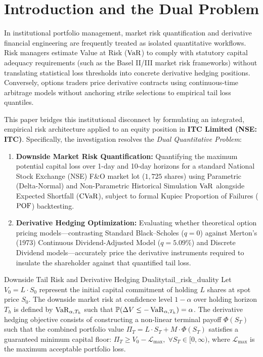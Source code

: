 
\section{Introduction and the Dual Problem}
\label{sec:introduction}
\thispagestyle{plain}

In institutional portfolio management, market risk quantification and derivative financial engineering are frequently treated as isolated quantitative workflows. Risk managers estimate Value at Risk ($\operatorname{VaR}$) to comply with statutory capital adequacy requirements (such as the Basel II/III market risk frameworks) without translating statistical loss thresholds into concrete derivative hedging positions. Conversely, options traders price derivative contracts using continuous-time arbitrage models without anchoring strike selections to empirical tail loss quantiles.

This paper bridges this institutional disconnect by formulating an integrated, empirical risk architecture applied to an equity position in \textbf{ITC Limited (NSE: ITC)}. Specifically, the investigation resolves the \textit{Dual Quantitative Problem}:
\begin{enumerate}[label=(\roman*), noitemsep]
    \item \textbf{Downside Market Risk Quantification:} Quantifying the maximum potential capital loss over 1-day and 10-day horizons for a standard National Stock Exchange (NSE) F\&O market lot ($1,725$ shares) using Parametric (Delta-Normal) and Non-Parametric Historical Simulation $\operatorname{VaR}$ alongside Expected Shortfall ($\operatorname{CVaR}$), subject to formal Kupiec Proportion of Failures ($\operatorname{POF}$) backtesting.
    \item \textbf{Derivative Hedging Optimization:} Evaluating whether theoretical option pricing models---contrasting Standard Black--Scholes ($q=0$) against Merton's (1973) Continuous Dividend-Adjusted Model ($q=5.09\%$) and Discrete Dividend models---accurately price the derivative instruments required to insulate the shareholder against that quantified tail loss.
\end{enumerate}

\begin{definition}{Downside Tail Risk and Derivative Hedging Duality}{tail_risk_duality}
Let $V_0 = L \cdot S_0$ represent the initial capital commitment of holding $L$ shares at spot price $S_0$. The downside market risk at confidence level $1 - \alpha$ over holding horizon $T_h$ is defined by $\operatorname{VaR}_{\alpha, T_h}$ such that $\mathbb{P}(\Delta V \le -\operatorname{VaR}_{\alpha, T_h}) = \alpha$. The derivative hedging objective consists of constructing a non-linear terminal payoff $\Phi(S_T)$ such that the combined portfolio value $\Pi_T = L \cdot S_T + M \cdot \Phi(S_T)$ satisfies a guaranteed minimum capital floor: $\Pi_T \ge V_0 - \mathcal{L}_{\max}, \; \forall S_T \in [0, \infty)$, where $\mathcal{L}_{\max}$ is the maximum acceptable portfolio loss.
\end{definition}
